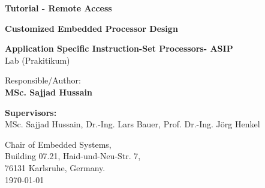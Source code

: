 \begin{titlepage}
\thispagestyle{empty}

\begin{center}
\hbox{}
\vfill

{\usesf\large
{\huge\bfseries Tutorial - Remote Access}
\vskip 2.5cm

{\LARGE\bfseries Customized Embedded Processor Design}
\vskip 0.25cm

{\large\bfseries Application Specific Instruction-Set Processors- ASIP\\}
Lab (Prakitikum)
\vskip 1.5cm

Responsible/Author:  \\
{\large\bfseries MSc. Sajjad Hussain\\}

}
\end{center}
\vskip 3cm

\textbf{Supervisors:}  \\
{MSc. Sajjad Hussain,  Dr.-Ing. Lars Bauer, Prof. Dr.-Ing. Jörg Henkel\\}

\vskip 2cm
Chair of Embedded Systems,\\
Building 07.21, Haid-und-Neu-Str. 7, \\
76131 Karlsruhe, Germany. \\

\vskip 1cm
\rightline\today

\vfill
\end{titlepage}
